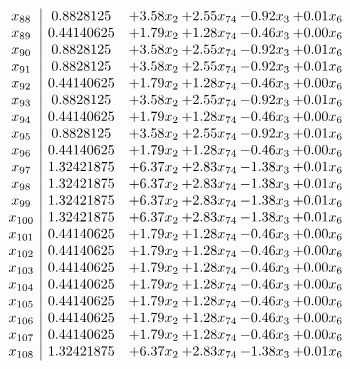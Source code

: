 \documentclass[8pt]{article}
\begin{document}
\[\begin{array}{c| c c@{\hskip 2pt} c@{\hskip 2pt} c@{\hskip 2pt} c@{\hskip 2pt} }
 x_{88}   &  0.8828125 & +  3.58 x_{2} & +  2.55 x_{74} & -0.92 x_{3} & +  0.01 x_{6}\\
 x_{89}   &  0.44140625 & +  1.79 x_{2} & +  1.28 x_{74} & -0.46 x_{3} & +  0.00 x_{6}\\
 x_{90}   &  0.8828125 & +  3.58 x_{2} & +  2.55 x_{74} & -0.92 x_{3} & +  0.01 x_{6}\\
 x_{91}   &  0.8828125 & +  3.58 x_{2} & +  2.55 x_{74} & -0.92 x_{3} & +  0.01 x_{6}\\
 x_{92}   &  0.44140625 & +  1.79 x_{2} & +  1.28 x_{74} & -0.46 x_{3} & +  0.00 x_{6}\\
 x_{93}   &  0.8828125 & +  3.58 x_{2} & +  2.55 x_{74} & -0.92 x_{3} & +  0.01 x_{6}\\
 x_{94}   &  0.44140625 & +  1.79 x_{2} & +  1.28 x_{74} & -0.46 x_{3} & +  0.00 x_{6}\\
 x_{95}   &  0.8828125 & +  3.58 x_{2} & +  2.55 x_{74} & -0.92 x_{3} & +  0.01 x_{6}\\
 x_{96}   &  0.44140625 & +  1.79 x_{2} & +  1.28 x_{74} & -0.46 x_{3} & +  0.00 x_{6}\\
 x_{97}   &  1.32421875 & +  6.37 x_{2} & +  2.83 x_{74} & -1.38 x_{3} & +  0.01 x_{6}\\
 x_{98}   &  1.32421875 & +  6.37 x_{2} & +  2.83 x_{74} & -1.38 x_{3} & +  0.01 x_{6}\\
 x_{99}   &  1.32421875 & +  6.37 x_{2} & +  2.83 x_{74} & -1.38 x_{3} & +  0.01 x_{6}\\
 x_{100}   &  1.32421875 & +  6.37 x_{2} & +  2.83 x_{74} & -1.38 x_{3} & +  0.01 x_{6}\\
 x_{101}   &  0.44140625 & +  1.79 x_{2} & +  1.28 x_{74} & -0.46 x_{3} & +  0.00 x_{6}\\
 x_{102}   &  0.44140625 & +  1.79 x_{2} & +  1.28 x_{74} & -0.46 x_{3} & +  0.00 x_{6}\\
 x_{103}   &  0.44140625 & +  1.79 x_{2} & +  1.28 x_{74} & -0.46 x_{3} & +  0.00 x_{6}\\
 x_{104}   &  0.44140625 & +  1.79 x_{2} & +  1.28 x_{74} & -0.46 x_{3} & +  0.00 x_{6}\\
 x_{105}   &  0.44140625 & +  1.79 x_{2} & +  1.28 x_{74} & -0.46 x_{3} & +  0.00 x_{6}\\
 x_{106}   &  0.44140625 & +  1.79 x_{2} & +  1.28 x_{74} & -0.46 x_{3} & +  0.00 x_{6}\\
 x_{107}   &  0.44140625 & +  1.79 x_{2} & +  1.28 x_{74} & -0.46 x_{3} & +  0.00 x_{6}\\
 x_{108}   &  1.32421875 & +  6.37 x_{2} & +  2.83 x_{74} & -1.38 x_{3} & +  0.01 x_{6}\\

\end{array}\]
\end{document}
